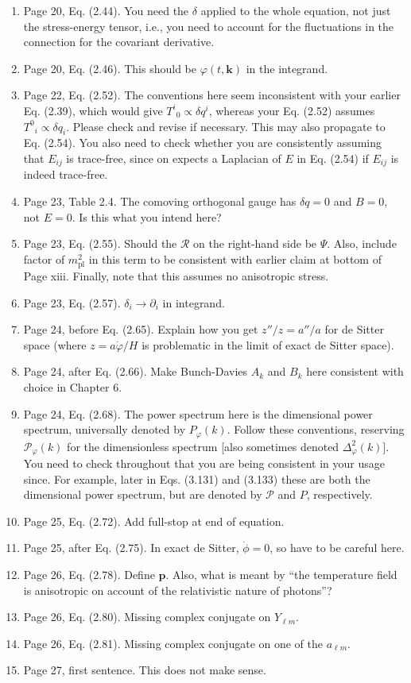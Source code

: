 \documentclass[11pt]{article}
\begin{document}
\begin{enumerate}
\item Page 20, Eq. (2.44). You need the $\delta$ applied to the whole
  equation, not just the stress-energy tensor, i.e., you need to
  account for the fluctuations in the connection for the covariant
  derivative.
\item Page 20, Eq. (2.46). This should be $\varphi(t,\mathbf{k})$ in
  the integrand.
\item Page 22, Eq. (2.52). The conventions here seem inconsistent with
  your earlier Eq. (2.39), which would give $T^i{}_0 \propto \delta
  q^i$, whereas your Eq. (2.52) assumes $T^0{}_i \propto \delta
  q_i$. Please check and revise if necessary. This may also propagate
  to Eq. (2.54). You also need to check whether you are consistently
  assuming that $E_{ij}$ is trace-free, since on expects a Laplacian
  of $E$ in Eq. (2.54) if $E_{ij}$ is indeed trace-free.
\item Page 23, Table 2.4. The comoving orthogonal gauge has $\delta q
  = 0$ and $B=0$, not $E=0$. Is this what you intend here?
\item Page 23, Eq. (2.55). Should the $\mathcal{R}$ on the right-hand
  side be $\Psi$. Also, include factor of $m_{\text{pl}}^2$ in this
  term to be consistent with earlier claim at bottom of Page
  xiii. Finally, note that this assumes no anisotropic stress.
\item Page 23, Eq. (2.57). $\delta_i \rightarrow \partial_i$ in
  integrand.
\item Page 24, before Eq. (2.65). Explain how you get $z''/z = a''/a$
  for de Sitter space (where $z = a\dot{\varphi}/H$ is problematic in
  the limit of exact de Sitter space).
\item Page 24, after Eq. (2.66). Make Bunch-Davies $A_k$ and $B_k$
  here consistent with choice in Chapter 6.
\item Page 24, Eq. (2.68). The power spectrum here is the dimensional
  power spectrum, universally denoted by $P_{\varphi}(k)$. Follow
  these conventions, reserving $\mathcal{P}_\varphi(k)$ for the
  dimensionless spectrum [also sometimes denoted
  $\Delta_\varphi^2(k)$]. You need to check throughout that you are
  being consistent in your usage since. For example, later in
  Eqs. (3.131) and (3.133) these are both the dimensional power
  spectrum, but are denoted by $\mathcal{P}$ and $P$, respectively.
\item Page 25, Eq. (2.72). Add full-stop at end of equation.
\item Page 25, after Eq. (2.75). In exact de Sitter, $\dot{\phi} = 0$,
  so have to be careful here.
\item Page 26, Eq. (2.78). Define $\mathbf{p}$. Also, what is meant by
  ``the temperature field is anisotropic on account of the
  relativistic nature of photons''?
\item Page 26, Eq. (2.80). Missing complex conjugate on $Y_{\ell m}$.
\item Page 26, Eq. (2.81). Missing complex conjugate on one of the
  $a_{\ell m}$.
\item Page 27, first sentence. This does not make sense.
\end{enumerate}
\end{document}
